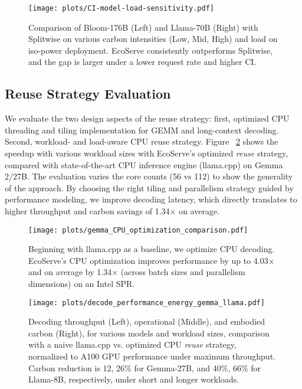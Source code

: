     


\begin{figure}[t]
    \centering
    \texttt{[image: plots/CI-model-load-sensitivity.pdf]}\vspace{-0.2in}
    \caption{Comparison of Bloom-176B (Left) and Llama-70B (Right) with Splitwise on various carbon intensities (Low, Mid, High) and load on iso-power deployment. EcoServe consistently outperforms Splitwise, and the gap is larger under a lower request rate and higher CI. }
    \label{fig:split-compare-2}
\end{figure}



\subsection{Reuse Strategy Evaluation}
We evaluate the two design aspects of the reuse strategy: first, optimized CPU threading and tiling implementation for GEMM and long-context decoding. Second, workload- and load-aware CPU reuse strategy.
Figure ~\ref{fig:speedup-reuse} shows the speedup with various workload sizes with EcoServe's optimized \textit{reuse} strategy, compared with state-of-the-art CPU inference engine (llama.cpp) on Gemma 2/27B. The evaluation varies the core counts (56 vs 112) to show the generality of the approach. By choosing the right tiling and parallelism strategy guided by performance modeling, we improve decoding latency, which directly translates to higher throughput and carbon savings of 1.34$\times$ on average. 



\begin{figure}[h]
    \centering
    \texttt{[image: plots/gemma\_CPU\_optimization\_comparison.pdf]}
    \vspace{-1.5em}
    \caption{Beginning with llama.cpp as a baseline, we optimize CPU decoding. EcoServe's CPU optimization improves performance by up to 4.03$\times$ and on average by 1.34$\times$ (across batch sizes and parallelism dimensions) on an Intel SPR.}
    \label{fig:speedup-reuse}
    \vspace{-1em}
\end{figure}








\begin{figure}
    \centering
    \texttt{[image: plots/decode\_performance\_energy\_gemma\_llama.pdf]}
    \vspace{-1.8em}
    \caption{Decoding throughput (Left), operational (Middle), and embodied carbon (Right), for various models and workload sizes, comparison with a naive llama.cpp vs. optimized CPU \textit{reuse} strategy, normalized to A100 GPU performance under maximum throughput. Carbon reduction is 12, 26\% for Gemma-27B, and 40\%, 66\% for Llama-8B, respectively, under short and longer workloads. }
    \label{fig:reuse-result}
    \vspace{-1.5em}
\end{figure}





